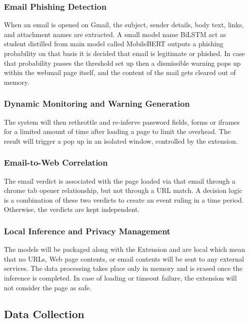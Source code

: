 \documentclass{FastFyp}
\begin{document}
\subsubsection{Email Phishing Detection}

When an email is opened on Gmail, the subject, sender details, body text, links, and attachment names are extracted. A small model name BiLSTM act as student distilled from main model called MobileBERT outputs a phishing probability on that basis it is decided that email is legitimate or phished. In case that probability passes the threshold set up then a dismissible warning pops up within the webmail page itself, and the content of the mail gets cleared out of memory.
\subsubsection{Dynamic Monitoring and Warning Generation}

The system will then rethrottle and re-inferve password fields, forms or iframes for a limited amount of time after loading a page to limit the overhead. The result will trigger a pop up in an isolated window, controlled by the extension.

\subsubsection{Email-to-Web Correlation}

The email verdict is associated with the page loaded via that email through a chrome tab opener relationship, but not through a URL match. A decision logic is a combination of these two verdicts to create an event ruling in a time period. Otherwise, the verdicts are kept independent.

\subsubsection{Local Inference and Privacy Management}

The models will be packaged along with the Extension and are local which mean that no URLs, Web page contents, or email contents will be sent to any external services. The data processing takes place only in memory and is erased once the inference is completed. In case of loading or timeout failure, the extension will not consider the page as safe.

\subsection{Data Collection}
\end{document}
